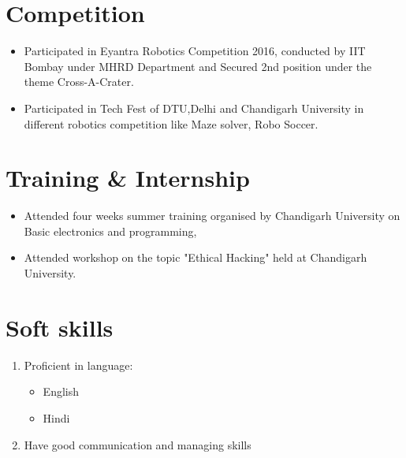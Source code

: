 \documentclass[11pt,a4paper]{article}
\begin{document}
\section*{Competition}
\vspace{-0.7em}\hline \vspace{1.5em}
\begin{itemize} %
\item Participated in Eyantra Robotics Competition 2016, conducted by IIT Bombay under MHRD Department and Secured 2nd position under the theme Cross-A-Crater.
\item Participated in Tech Fest of DTU,Delhi and Chandigarh University in different robotics competition like Maze solver, Robo Soccer.
\end{itemize}


\section*{Training \& Internship}
\vspace{-0.7em}\hline \vspace{1.5em}
\begin{itemize}
\item Attended four weeks summer training organised by Chandigarh University on Basic electronics and programming,
\item Attended workshop on the topic "Ethical Hacking" held at Chandigarh University.

\end{itemize}
\section*{Soft skills}
\vspace{-0.7em}\hline \vspace{1.5em}
\begin{enumerate}
\item Proficient in language:
\begin{itemize}
\item English
\item Hindi

\end{itemize}
\item Have good communication and managing skills
\end{enumerate}
\end{document}

